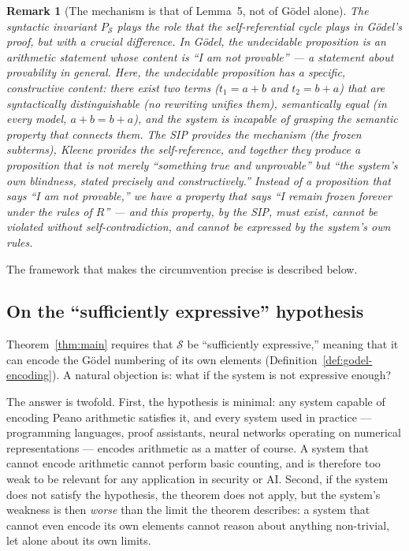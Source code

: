 \documentclass[11pt]{article}
\newtheorem{remark}[theorem]{Remark}
\begin{document}
\begin{remark}[The mechanism is that of Lemma~5, not of G\"odel alone]
The syntactic invariant $P_{\mathcal{S}}$ plays the role that the
self-referential cycle plays in G\"odel's proof, but with a crucial
difference. In G\"odel, the undecidable proposition is an arithmetic
statement whose content is ``I am not provable'' --- a statement about
provability in general. Here, the undecidable proposition has a specific,
constructive content: there exist two terms ($t_1 = a+b$ and
$t_2 = b+a$) that are syntactically distinguishable (no rewriting
unifies them), semantically equal (in every model, $a+b = b+a$), and
the system is incapable of grasping the semantic property that connects
them. The SIP provides the \emph{mechanism} (the frozen subterms),
Kleene provides the \emph{self-reference}, and together they produce a
proposition that is not merely ``something true and unprovable'' but
``the system's own blindness, stated precisely and constructively.''
Instead of a proposition that says ``I am not provable,'' we have a
property that says ``I remain frozen forever under the rules of $R$'' ---
and this property, by the SIP, must exist, cannot be violated without
self-contradiction, and cannot be expressed by the system's own rules.
\end{remark} The framework that makes the circumvention precise is
described below.

\subsection{On the ``sufficiently expressive'' hypothesis}

Theorem~\ref{thm:main} requires that $\mathcal{S}$ be ``sufficiently
expressive,'' meaning that it can encode the G\"odel numbering of its
own elements (Definition~\ref{def:godel-encoding}). A natural objection
is: what if the system is not expressive enough?

The answer is twofold. First, the hypothesis is minimal: any system
capable of encoding Peano arithmetic satisfies it, and every system used
in practice --- programming languages, proof assistants, neural networks
operating on numerical representations --- encodes arithmetic as a
matter of course. A system that cannot encode arithmetic cannot perform
basic counting, and is therefore too weak to be relevant for any
application in security or AI. Second, if the system does not satisfy
the hypothesis, the theorem does not apply, but the system's weakness is
then \emph{worse} than the limit the theorem describes: a system that
cannot even encode its own elements cannot reason about anything
non-trivial, let alone about its own limits.
\end{document}
